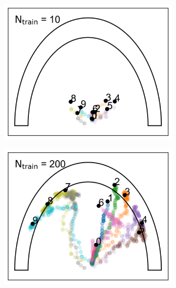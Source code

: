 \documentclass[aps,prb,twocolumn,superscriptaddress,floatfix,longbibliography]{revtex4-2}
\begin{document}
\begin{figure}
  \centering
  \begin{subfigure}[b]{0.24\textwidth}
      \centering
      \includegraphics[width=\textwidth]{ej2_fig1_1.png}
      \caption{\label{fig:ej2_fig1_1}}
  \end{subfigure}
  \hfill
  \begin{subfigure}[b]{0.24\textwidth}
      \centering
      \includegraphics[width=\textwidth]{ej2_fig1_2.png}
      \caption{\label{fig:ej2_fig1_2}}
  \end{subfigure}
  \hfill
  \begin{subfigure}[b]{0.24\textwidth}

\end{subfigure}
\end{figure}
\end{document}
